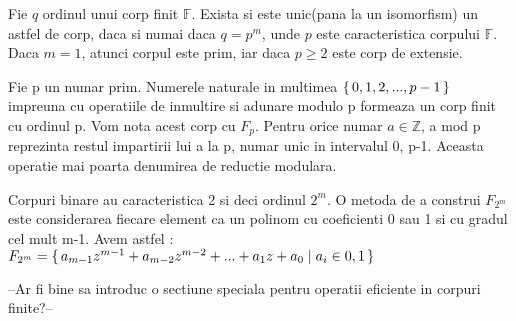 \begin{teo}
Fie $q$ ordinul unui corp finit $\mathbb{F}$. Exista si este unic(pana la un isomorfism) un astfel de corp, daca si numai daca $q=p^{m}$, unde $p$ este caracteristica corpului $\mathbb{F}$. Daca $m=1$, atunci corpul este prim, iar daca $p\geq 2$ este corp de extensie.
\end{teo}

\begin{dfn}
Fie p un numar prim. Numerele naturale in multimea $\set {0, 1, 2, ... , p-1 }$ impreuna cu operatiile de inmultire si adunare modulo p formeaza un corp finit cu ordinul p. Vom nota acest corp cu $F_p$. Pentru orice numar $a\in\mathbb{Z}$, a mod p reprezinta restul impartirii lui a la p, numar unic in intervalul 0, p-1. Aceasta operatie mai poarta denumirea de reductie modulara.
\end{dfn}

\begin{dfn}
Corpuri binare au caracteristica 2 si deci ordinul $2^{m}$. O metoda de a construi $F_{2^m}$ este considerarea fiecare element ca un polinom cu coeficienti 0 sau 1 si cu gradul cel mult m-1. Avem astfel : 
 $F_{2^m} = \set {a_{m-1}z^{m-1} + a_{m-2}z^{m-2} + ... + a_{1}z + a_{0}\mid a_{i}\in {0,1}}$
\end{dfn}

--Ar fi bine sa introduc o sectiune speciala pentru operatii eficiente in corpuri finite?--


